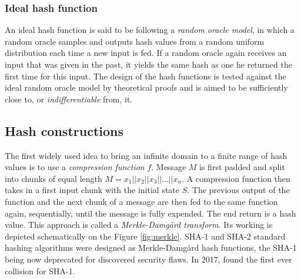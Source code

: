 \subsubsection{Ideal hash function}
An ideal hash function is said to be following a \textit{random oracle model}, in which a random oracle samples and outputs hash values from a random uniform distribution each time a new input is fed. If a random oracle again receives an input that was given in the past, it yields the same hash as one he returned the first time for this input. The design of the hash functions is tested against the ideal random oracle model by theoretical proofs and is aimed to be sufficiently close to, or \textit{indifferentiable} from, it.

\subsection[hash_constrs]{Hash constructions}
The first widely used idea to bring an infinite domain to a finite range of hash values is to use a \textit{compression function} $f$. Message $M$ is first padded and split into chunks of equal length $M=x_1||x_2||x_3||\ldots||x_n$. A compression function then takes in a first input chunk with the initial state $S$. The previous output of the function and the next chunk of a message are then fed to the same function again, sequentially, until the message is fully expended. The end return is a hash value. This approach is called a \textit{Merkle-Damgård transform}. Its working is depicted schematically on the Figure \ref{fig:merkle}. SHA-1 and SHA-2 standard hashing algorithms were designed as Merkle-Damgård hash functions, the SHA-1 being now deprecated for discovered security flaws. In 2017, \cite{firstcollision} found the first ever collision for SHA-1.

